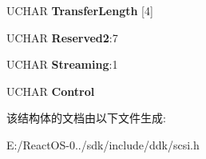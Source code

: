\begin{DoxyCompactItemize}
U\+C\+H\+AR {\bfseries Transfer\+Length} \mbox{[}4\mbox{]}
\item 
\mbox{\label{struct___c_d_b_1_1___r_e_a_d12_aa87ecfd334235b59ab4afb547dc55202}} 
U\+C\+H\+AR {\bfseries Reserved2}\+:7
\item 
\mbox{\label{struct___c_d_b_1_1___r_e_a_d12_aa2b386e8890ade610674235e7a523e7f}} 
U\+C\+H\+AR {\bfseries Streaming}\+:1
\item 
\mbox{\label{struct___c_d_b_1_1___r_e_a_d12_a9393c058f80a2a3028fa86f41f6163cd}} 
U\+C\+H\+AR {\bfseries Control}
\end{DoxyCompactItemize}


该结构体的文档由以下文件生成\+:\begin{DoxyCompactItemize}
\item 
E\+:/\+React\+O\+S-\/0../sdk/include/ddk/scsi.\+h\end{DoxyCompactItemize}
